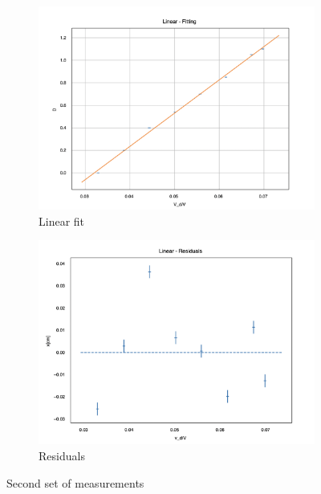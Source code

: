 \documentclass[12pt]{article}
\begin{document}
\begin{figure}[H]
  \centering
  \begin{subfigure}[b]{0.45\textwidth}
    \includegraphics[width=\textwidth]{Electric measurments/second set fit.png}
    \caption{Linear fit}
    \label{fig:second_set_fit}
  \end{subfigure}\hfill
  \begin{subfigure}[b]{0.45\textwidth}
    \includegraphics[width=\textwidth]{Electric measurments/second set residual.png}
    \caption{Residuals}
    \label{fig:second_set_residual}
  \end{subfigure}
  \caption{Second set of measurements}
  \label{fig:second_set}
\end{figure}
\end{document}
